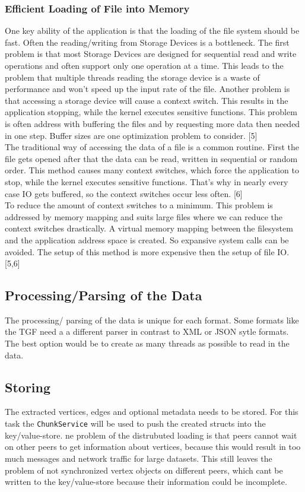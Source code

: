 \subsubsection{Efficient Loading of File into Memory}
One key ability of the application is that the loading of the file system should be fast. Often the reading/writing from Storage Devices is a bottleneck. The first problem is that most Storage Devices are designed for sequential read and write operations and often support only one operation at a time. This leads to the problem that multiple threads reading the storage device is a waste of performance and won't speed up the input rate of the file. Another problem is that accessing a storage device will cause a context switch. This results in the application stopping, while the kernel executes sensitive functions. This problem is often address with buffering the files and by requesting more data then needed in one step. Buffer sizes are one optimization problem to consider. [5]\\
The traditional way of accessing the data of a file is a common routine. First the file gets opened after that the data can be read, written in sequential or random order. This method causes many context switches, which force the application to stop, while the kernel executes sensitive functions. That's why in nearly every case IO gets buffered, so the context switches occur less often. [6]\\
To reduce the amount of context switches to a minimum. This problem is addressed by memory mapping and suits large files where we can reduce the context switches drastically. A virtual memory mapping between the filesystem and the application address space is created. So expansive system calls can be avoided. The setup of this method is more expensive then the setup of file IO. [5,6]\pageref{sec:FileReading}


\subsection{Processing/Parsing of the Data}
The processing/ parsing of the data is unique for each format. Some formats like the TGF need a a different parser in contrast to XML or JSON sytle formats. The best option would be to create as many threads as possible to read in the data.

\subsection{Storing}
The extracted vertices, edges and optional metadata needs to be stored. For this task the \texttt{ChunkService} will be used to push the created structs into the key/value-store. ne problem of the distrubuted loading is that peers cannot wait on other peers to get information about vertices, because this would result in too much messages and network traffic for large datasets. This still leaves the problem of not synchronized vertex objects on different peers, which cant be written to the key/value-store because their information could be incomplete. 
